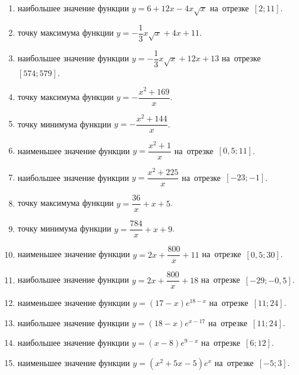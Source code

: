 \documentclass[a4paper,10pt]{article}
\begin{document}
\begin{enumerate}
\item {} наибольшее значение функции $y=6+12x -4x\sqrt{x}$ на~отрезке~$\left[2;11\right]$.

\item {} точку максимума функции $y=-\dfrac{1}{3}x\sqrt{x} +4x+11$.

\item {} наибольшее значение функции $y=-\dfrac{1}{3}x\sqrt{x} +12x+13$ на~отрезке~$\left[574;579\right]$.

\item {} точку максимума функции $y=-\dfrac{x^2 +169}{x}$.

\item {} точку минимума функции $y=-\dfrac{x^2 +144}{x}$.

\item {} наименьшее значение функции $y=\dfrac{x^2 +1}{x}$ на~отрезке~$\left[0,5;11\right]$.

\item {} наибольшее значение функции $y=\dfrac{x^2 +225}{x}$ на~отрезке~$\left[-23;-1\right]$.

\item {} точку максимума функции $y=\dfrac{36}{x} +x+5$.

\item {} точку минимума функции $y=\dfrac{784}{x} +x+9$.

\item {} наименьшее значение функции $y=2x+\dfrac{800}{x} +11$ на~отрезке~$\left[0,5;30\right]$.

\item {} наибольшее значение функции $y=2x+\dfrac{800}{x} +18$ на~отрезке~$\left[-29;-0,5\right]$.

\item {} наименьшее значение функции $y=\left(17-x\right)e^{18-x}$ на~отрезке~$\left[11;24\right]$.

\item {} наибольшее значение функции $y=\left(18-x\right)e^{x-17}$ на~отрезке~$\left[11;24\right]$.

\item {} наибольшее значение функции $y=\left(x-8\right)e^{9-x}$ на~отрезке~$\left[6;12\right]$.

\item {} наименьшее значение функции $y=\left(x^2 +5x -5\right)e^{x }$ на~отрезке~$\left[-5;3\right]$.


\end{enumerate}
\end{document}

